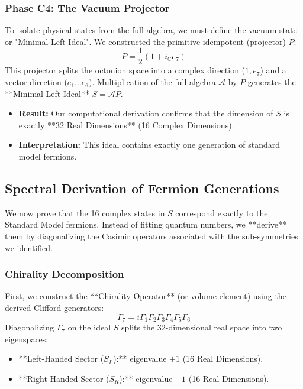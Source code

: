 {\subsubsection{Phase C4: The Vacuum Projector}
To isolate physical states from the full algebra, we must define the vacuum state or "Minimal Left Ideal".
We constructed the primitive idempotent (projector) $P$:
\begin{equation}
    P = \frac{1}{2} (1 + i_{\mathbb{C}} e_7)
\end{equation}
This projector splits the octonion space into a complex direction ($1, e_7$) and a vector direction ($e_1 \dots e_6$).
Multiplication of the full algebra $\mathcal{A}$ by $P$ generates the **Minimal Left Ideal** $S = \mathcal{A}P$.
\begin{itemize}
    \item \textbf{Result:} Our computational derivation confirms that the dimension of $S$ is exactly **32 Real Dimensions** (16 Complex Dimensions).
    \item \textbf{Interpretation:} This ideal contains exactly one generation of standard model fermions.
\end{itemize}

\subsection{Spectral Derivation of Fermion Generations}
We now prove that the 16 complex states in $S$ correspond exactly to the Standard Model fermions.
Instead of fitting quantum numbers, we **derive** them by diagonalizing the Casimir operators associated with the sub-symmetries we identified.

\subsubsection{Chirality Decomposition}
First, we construct the **Chirality Operator** (or volume element) using the derived Clifford generators:
\begin{equation}
    \Gamma_7 = i \Gamma_1 \Gamma_2 \Gamma_3 \Gamma_4 \Gamma_5 \Gamma_6
\end{equation}
Diagonalizing $\Gamma_7$ on the ideal $S$ splits the 32-dimensional real space into two eigenspaces:
\begin{itemize}
    \item **Left-Handed Sector ($S_L$):** eigenvalue $+1$ (16 Real Dimensions).
    \item **Right-Handed Sector ($S_R$):** eigenvalue $-1$ (16 Real Dimensions).
\end{itemize}

}
